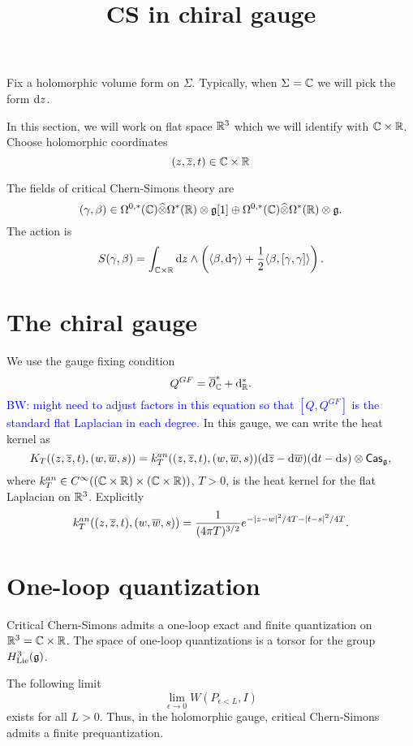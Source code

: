\documentclass[11pt]{amsart}
\title{CS in chiral gauge}
\def\brian{\textcolor{blue}{BW: }\textcolor{blue}}
\def\ctensor{\Hat{\tensor}}
\def\Cas{{\sf Cas}}
\begin{document}
\maketitle

Fix a holomorphic volume form on $\Sigma$. 
Typically, when $\Sigma = \mathbb C$ we will pick the form ${\rm d} z$. 

In this section, we will work on flat space $\mathbb R^3$ which we will identify with $\mathbb C \times \mathbb R$. 
Choose holomorphic coordinates
\[
(z,\overline{z}, t) \in \mathbb C \times \mathbb R
\]

The fields of critical Chern-Simons theory are 
\[
(\gamma, \beta) \in \Omega^{0,*}(\CC) \ctensor \Omega^*(\RR) \tensor \fg[1] \oplus \Omega^{0,*}(\CC) \ctensor \Omega^*(\RR) \tensor \fg .
\]
The action is
\[
S(\gamma, \beta) = \int_{\mathbb C \times \mathbb R} {\rm d} z \wedge \left(\langle\beta, {\rm d} \gamma\rangle + \frac{1}{2} \langle\beta, [\gamma,\gamma]\rangle \right) .
\]

\section{The chiral gauge}

We use the gauge fixing condition
\[
Q^{GF} = \overline{\partial}^*_{\mathbb C} + {\rm d}_{\mathbb R}^* .
\]
\brian{might need to adjust factors in this equation so that $[Q,Q^{GF}]$ is the standard flat Laplacian in each degree.}
In this gauge, we can write the heat kernel as
\[
K_T ((z,\zbar, t), (w,\wbar, s)) = k_T^{an} ((z,\zbar, t), (w,\wbar, s)) (\d \zbar - \d \wbar) (\d t - \d s) \tensor \Cas_\fg,
\]
where $k_T^{an} \in C^\infty((\mathbb C \times \mathbb R) \times (\mathbb C \times \mathbb R))$, $T > 0$, is the heat kernel for the flat Laplacian on $\mathbb R^3$. 
Explicitly 
\[
 k_T^{an} ((z,\overline{z}, t), (w,\overline{w}, s)) = \frac{1}{(4 \pi T)^{3/2}} e^{-|z-w|^2/ 4T - |t-s|^2/4T} . 
 \]

\section{One-loop quantization}

\begin{thm}
Critical Chern-Simons admits a one-loop exact and finite quantization on $\mathbb R^3 = \mathbb C \times \mathbb R$. 
The space of one-loop quantizations is a torsor for the group $H^3_{\rm Lie}(\mathfrak g)$.
\end{thm}

\begin{prop}
The following limit 
\[
\lim_{\epsilon \to 0} W(P_{\epsilon < L}, I)
\]
exists for all $L > 0$. 
Thus, in the holomorphic gauge, critical Chern-Simons admits a finite prequantization. 
\end{prop}
\end{document}

